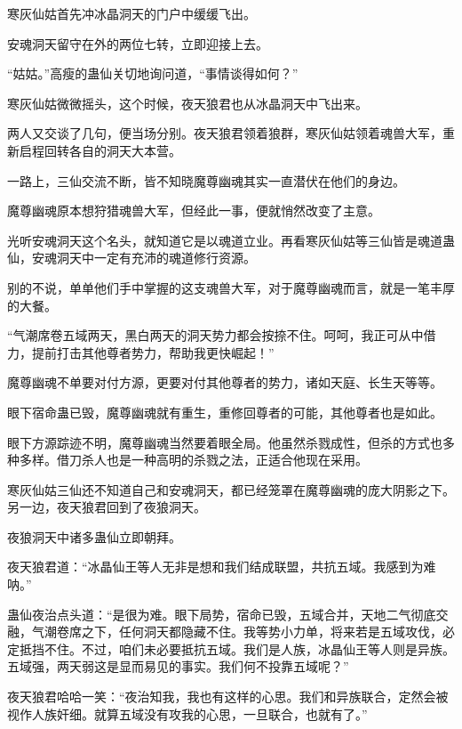 
\begin{this_body}



寒灰仙姑首先冲冰晶洞天的门户中缓缓飞出。

安魂洞天留守在外的两位七转，立即迎接上去。

“姑姑。”高瘦的蛊仙关切地询问道，“事情谈得如何？”

寒灰仙姑微微摇头，这个时候，夜天狼君也从冰晶洞天中飞出来。

两人又交谈了几句，便当场分别。夜天狼君领着狼群，寒灰仙姑领着魂兽大军，重新启程回转各自的洞天大本营。

一路上，三仙交流不断，皆不知晓魔尊幽魂其实一直潜伏在他们的身边。

魔尊幽魂原本想狩猎魂兽大军，但经此一事，便就悄然改变了主意。

光听安魂洞天这个名头，就知道它是以魂道立业。再看寒灰仙姑等三仙皆是魂道蛊仙，安魂洞天中一定有充沛的魂道修行资源。

别的不说，单单他们手中掌握的这支魂兽大军，对于魔尊幽魂而言，就是一笔丰厚的大餐。

“气潮席卷五域两天，黑白两天的洞天势力都会按捺不住。呵呵，我正可从中借力，提前打击其他尊者势力，帮助我更快崛起！”

魔尊幽魂不单要对付方源，更要对付其他尊者的势力，诸如天庭、长生天等等。

眼下宿命蛊已毁，魔尊幽魂就有重生，重修回尊者的可能，其他尊者也是如此。

眼下方源踪迹不明，魔尊幽魂当然要着眼全局。他虽然杀戮成性，但杀的方式也多种多样。借刀杀人也是一种高明的杀戮之法，正适合他现在采用。

寒灰仙姑三仙还不知道自己和安魂洞天，都已经笼罩在魔尊幽魂的庞大阴影之下。另一边，夜天狼君回到了夜狼洞天。

夜狼洞天中诸多蛊仙立即朝拜。

夜天狼君道：“冰晶仙王等人无非是想和我们结成联盟，共抗五域。我感到为难呐。”

蛊仙夜治点头道：“是很为难。眼下局势，宿命已毁，五域合并，天地二气彻底交融，气潮卷席之下，任何洞天都隐藏不住。我等势小力单，将来若是五域攻伐，必定抵挡不住。不过，咱们未必要抵抗五域。我们是人族，冰晶仙王等人则是异族。五域强，两天弱这是显而易见的事实。我们何不投靠五域呢？”

夜天狼君哈哈一笑：“夜治知我，我也有这样的心思。我们和异族联合，定然会被视作人族奸细。就算五域没有攻我的心思，一旦联合，也就有了。”


\end{this_body}

